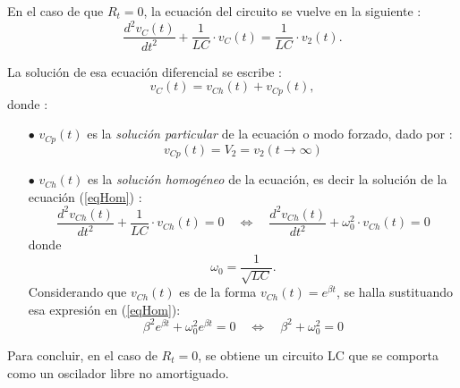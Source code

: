 \documentclass[a4paper]{article}
\begin{document}
En el caso de que $R_{t}=0$, la ecuación del circuito se vuelve en la siguiente :
\begin{equation}
\frac{d^{2}v_{C}(t)}{dt^{2}}+\frac{1}{LC}\cdot v_{C}(t)=\frac{1}{LC}\cdot v_{2}(t).
\end{equation}

La solución de esa ecuación diferencial se escribe :
\begin{equation}
v_{C}(t)=v_{Ch}(t)+v_{Cp}(t),
\end{equation}
donde :
\begin{itemize}
\item[$\bullet$] $v_{Cp}(t)$ es la \emph{solución particular} de la ecuación o modo forzado, dado por :
\begin{equation}
v_{Cp}(t)=V_{2}=v_{2}(t\to\infty)
\end{equation}
\item[$\bullet$] $v_{Ch}(t)$ es la \emph{solución homogéneo} de la ecuación, es decir la solución de la ecuación (\ref{eqHom}) :
\begin{equation}\label{eqHom}
\frac{d^{2}v_{Ch}(t)}{dt^{2}}+\frac{1}{LC}\cdot v_{Ch}(t)=0
\quad\Leftrightarrow\quad
\frac{d^{2}v_{Ch}(t)}{dt^{2}}+\omega_{0}^{2}\cdot v_{Ch}(t)=0
\end{equation}
donde
\begin{equation}
\omega_{0}=\frac{1}{\sqrt{LC}}.
\end{equation} 
Considerando que $v_{Ch}(t)$ es de la forma $v_{Ch}(t)=e^{\beta t}$, se halla sustituando esa expresión en (\ref{eqHom}):
\begin{equation}
\beta^{2}e^{\beta t}+\omega_{0}^{2}e^{\beta t}=0
\quad\Leftrightarrow\quad
\beta^{2}+\omega_{0}^{2}=0
\end{equation}
\end{itemize}

Para concluir, en el caso de $R_{t}=0$, se obtiene un circuito LC que se comporta como un oscilador libre no amortiguado.
\end{document}
